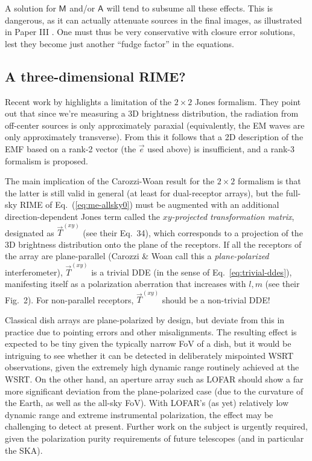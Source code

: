 \documentclass{aa}
\newcommand{\jones}[2]{\vec {#1}_{#2}}
\newcommand{\coh}[2]{\mathsf{{#1}}_{{#2}}}
\begin{document}
A solution for $\coh{M}{}$ and/or $\coh{A}{}$ will tend to subsume all these effects. This is dangerous, as it can actually attenuate sources in the final images, as illustrated in Paper III \citep[Sect.~1.5]{RRIME3}. One must thus be very conservative with closure error solutions, lest they become just another ``fudge factor'' in the equations.

\subsection{A three-dimensional RIME?\label{sec:3D-rime}}

Recent work by \citet{Carozzi:ME3D} highlights a limitation of the $2\times2$ Jones formalism. They point out that 
since we're measuring a 3D brightness distribution, the radiation from off-center sources is only approximately paraxial (equivalently, the EM waves are only approximately transverse). From this it follows that a 2D description of the EMF 
based on a rank-2  vector (the $\vec e$ used above) is insufficient, and a rank-3 formalism is proposed. 

The main implication of the Carozzi-Woan result for the $2\times2$ formalism is that the latter is still valid in general (at least for dual-receptor arrays), but the full-sky RIME of Eq.~(\ref{eq:me-allsky0}) must be augmented with an additional direction-dependent Jones term called the \emph{$xy$-projected transformation matrix}, designated as $\jones{T}{}^{(xy)}$ (see their Eq.~34), which corresponds to a projection of the 3D brightness distribution onto the plane of the receptors. If all the receptors of the array are plane-parallel (Carozzi \& Woan call this a {\em plane-polarized} interferometer), $\jones{T}{}^{(xy)}$ is a trivial DDE (in the sense of Eq.~\ref{eq:trivial-ddes}), manifesting itself as a polarization aberration that increases with $l,m$ (see their Fig.~2). For non-parallel receptors, $\jones{T}{}^{(xy)}$ should be a non-trivial DDE!

Classical dish arrays are plane-polarized by design, but deviate from this in practice due to pointing errors and other misalignments. The resulting effect is expected to be tiny given the typically narrow FoV of a dish, but it would be intriguing to see whether it can be detected in deliberately mispointed WSRT observations, given the extremely high dynamic range routinely achieved at the WSRT. On the other hand, an aperture array such as LOFAR should show a far more significant deviation from the plane-polarized case (due to the curvature of the Earth, as well as the all-sky FoV). With LOFAR's (as yet) relatively low dynamic range and extreme instrumental polarization, the effect may be challenging to detect at present. Further work on the subject is urgently required, given the polarization purity requirements of future telescopes (and in particular the SKA).
\end{document}
